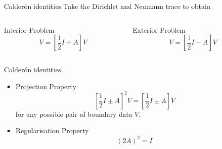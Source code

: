 \documentclass[dvipsnames,10pt]{beamer}
\begin{document}
\begin{frame}{Calder\'{o}n identities}
	\vspace{.5cm}
	Take the Dirichlet and Neumann trace to obtain
	
		\begin{center}
		\end{center}
		\begin{columns}[T]
			\begin{column}{.48\textwidth}
				\begin{tcolorbox}
					Interior Problem
					$$
					V = \left[\frac{1}{2}I + A\right]V
					$$
				\end{tcolorbox}
			\end{column}
			\begin{column}{.48\textwidth}
				\begin{tcolorbox}
					Exterior Problem
					$$
					V = \left[\frac{1}{2}I - A\right]V
					$$
				\end{tcolorbox}
			\end{column}
			
		\end{columns}
	
	
\end{frame}
\begin{frame}{Calder\'{o}n identities...}
	\begin{itemize}
		\item Projection Property
		$$\left[\frac{1}{2}I \pm A\right]^2V = \left[\frac{1}{2}I \pm A\right]V$$
		for any possible pair of boundary data $V$.
		\item Regularisation Property
		$$
		\left(2A\right)^2 = I
		$$
	\end{itemize}
\end{frame}
\end{document}
